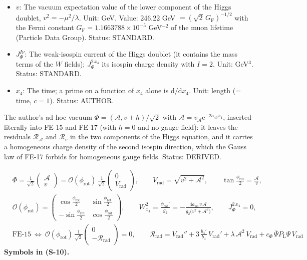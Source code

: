 \documentclass[
  10pt,
]{article}
\begin{document}
\begin{itemize}
\item
  \(v\): The vacuum expectation value of the lower component of the
  Higgs doublet, \(v^2 = -\mu^2/\lambda\). Unit: GeV. Value: 246.22 GeV
  \(= (\sqrt2\,G_{\mathrm{F}})^{-1/2}\) with the Fermi constant
  \(G_{\mathrm{F}} = 1.1663788\times10^{-5}\) GeV\(^{-2}\) of the muon
  lifetime (Particle Data Group). Status: STANDARD.
\item
  \(J_\Phi^{I\nu}\): The weak-isospin current of the Higgs doublet (it
  contains the mass terms of the \(W\) fields); \(J_\Phi^{2\,x_4}\) its
  isospin charge density with \(I = 2\). Unit: GeV\(^3\). Status:
  STANDARD.
\item
  \(x_4\): The time; a prime on a function of \(x_4\) alone is
  \(\mathrm{d}/\mathrm{d}x_4\). Unit: length (= time, \(c = 1\)).
  Status: AUTHOR.
\end{itemize}

The author's ad hoc vacuum \(\Phi = (\mathcal{A}, v + h)/\sqrt2\) with
\(\mathcal{A} = v_{\mathcal{A}}\mathrm{e}^{-2a_{40}x_4}\), inserted
literally into FE-15 and FE-17 (with \(h = 0\) and no gauge field): it
leaves the residuals \(\mathcal{R}_{\mathcal{A}}\) and \(\mathcal{R}_v\)
in the two components of the Higgs equation, and it carries a
homogeneous charge density of the second isospin direction, which the
Gauss law of FE-17 forbids for homogeneous gauge fields. Status:
DERIVED.

\[
\begin{aligned}
&\Phi = \frac{1}{\sqrt2}\begin{pmatrix}\mathcal{A}\\ v\end{pmatrix} = \mathcal{O}(\phi_{\mathrm{rot}})\,\frac{1}{\sqrt2}\begin{pmatrix}0\\ V_{\mathrm{rad}}\end{pmatrix},\qquad
 V_{\mathrm{rad}} = \sqrt{v^2 + \mathcal{A}^2},\qquad \tan\frac{\phi_{\mathrm{rot}}}{2} = \frac{\mathcal{A}}{v},\\
&\mathcal{O}(\phi_{\mathrm{rot}}) = \begin{pmatrix}\cos\frac{\phi_{\mathrm{rot}}}{2} & \sin\frac{\phi_{\mathrm{rot}}}{2}\\ -\sin\frac{\phi_{\mathrm{rot}}}{2} & \cos\frac{\phi_{\mathrm{rot}}}{2}\end{pmatrix},\qquad
 W^2_{x_4} = \frac{\phi_{\mathrm{rot}}'}{g_2} = -\frac{4a_{40}\,v\,\mathcal{A}}{g_2\big(v^2 + \mathcal{A}^2\big)},\qquad J_\Phi^{2\,x_4} = 0,\\
&\text{FE-15} \ \Leftrightarrow\ \mathcal{O}(\phi_{\mathrm{rot}})\,\frac{1}{\sqrt2}\begin{pmatrix}0\\ -\mathcal{R}_{\mathrm{rad}}\end{pmatrix} = 0,\qquad
 \mathcal{R}_{\mathrm{rad}} = V_{\mathrm{rad}}'' + 3\,\frac{b_4'}{b_4}\,V_{\mathrm{rad}}' + \lambda\,\mathcal{A}^2\,V_{\mathrm{rad}} + c_\Phi\,\bar\Psi P_{\mathrm{L}}\Psi\,V_{\mathrm{rad}}
\end{aligned} \tag{S-10}
\] \textbf{Symbols in (S-10).}
\end{document}
